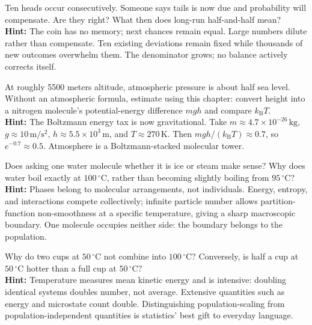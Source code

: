 \begin{puzzles}
\item Ten heads occur consecutively. Someone says tails is now due and probability will compensate. Are they right? What then does long-run half-and-half mean?\\\textbf{Hint:} The coin has no memory; next chances remain equal. Large numbers dilute rather than compensate. Ten existing deviations remain fixed while thousands of new outcomes overwhelm them. The denominator grows; no balance actively corrects itself.

\item At roughly 5500 meters altitude, atmospheric pressure is about half sea level. Without an atmospheric formula, estimate using this chapter: convert height into a nitrogen molecule's potential-energy difference \(mgh\) and compare \(k_{\mathrm B}T\).\\\textbf{Hint:} The Boltzmann energy tax is now gravitational. Take \(m\approx4.7\times10^{-26}\,\mathrm{kg}\), \(g\approx10\,\mathrm{m/s^2}\), \(h\approx5.5\times10^3\,\mathrm{m}\), and \(T\approx270\,\mathrm{K}\). Then \(mgh/(k_{\mathrm B}T)\approx0.7\), so \(e^{-0.7}\approx0.5\). Atmosphere is a Boltzmann-stacked molecular tower.

\item Does asking one water molecule whether it is ice or steam make sense? Why does water boil exactly at \(100\,^\circ\mathrm{C}\), rather than becoming slightly boiling from \(95\,^\circ\mathrm{C}\)?\\\textbf{Hint:} Phases belong to molecular arrangements, not individuals. Energy, entropy, and interactions compete collectively; infinite particle number allows partition-function non-smoothness at a specific temperature, giving a sharp macroscopic boundary. One molecule occupies neither side: the boundary belongs to the population.

\item Why do two cups at \(50\,^\circ\mathrm{C}\) not combine into \(100\,^\circ\mathrm{C}\)? Conversely, is half a cup at \(50\,^\circ\mathrm{C}\) hotter than a full cup at \(50\,^\circ\mathrm{C}\)?\\\textbf{Hint:} Temperature measures mean kinetic energy and is intensive: doubling identical systems doubles number, not average. Extensive quantities such as energy and microstate count double. Distinguishing population-scaling from population-independent quantities is statistics' best gift to everyday language.
\end{puzzles}
